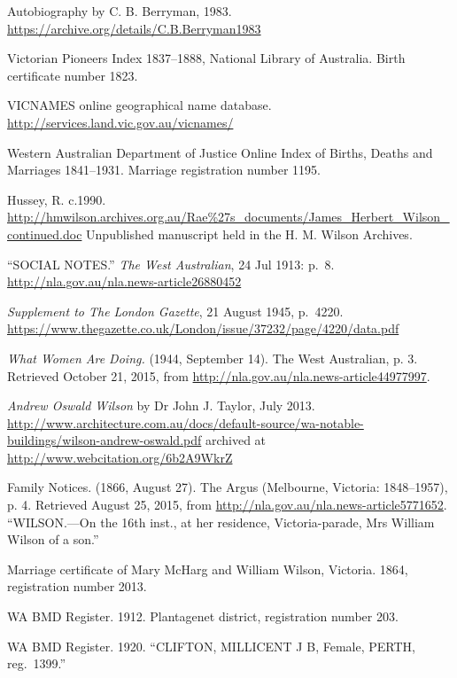 \begin{thebibliography}{999}
\footnotesize

	Autobiography by C. B. Berryman, 1983.
	\url{https://archive.org/details/C.B.Berryman1983}

	Victorian Pioneers Index 1837--1888, National Library of Australia.
	Birth certificate number 1823.

	VICNAMES online geographical name database.
	\url{http://services.land.vic.gov.au/vicnames/}

	Western Australian Department of Justice Online Index of Births, Deaths and Marriages 1841–1931.
	Marriage registration number 1195.

	Hussey, R. c.1990. \url{http://hmwilson.archives.org.au/Rae\%27s_documents/James_Herbert_Wilson_continued.doc}
	Unpublished manuscript held in the H. M. Wilson Archives.

	``SOCIAL NOTES.'' \emph{The West Australian}, 24 Jul 1913: p.\ 8.
	\url{http://nla.gov.au/nla.news-article26880452}

	\emph{Supplement to The London Gazette}, 21 August 1945, p.\ 4220.
	\url{https://www.thegazette.co.uk/London/issue/37232/page/4220/data.pdf}

	\emph{What Women Are Doing.} (1944, September 14). The West Australian, p. 3.
	Retrieved October 21, 2015, from \url{http://nla.gov.au/nla.news-article44977997}.

	\emph{Andrew Oswald Wilson} by Dr John J. Taylor, July 2013.
	\url{http://www.architecture.com.au/docs/default-source/wa-notable-buildings/wilson-andrew-oswald.pdf}
	archived at \url{http://www.webcitation.org/6b2A9WkrZ}

	Family Notices. (1866, August 27). The Argus (Melbourne, Victoria: 1848--1957), p. 4.
	Retrieved August 25, 2015, from \url{http://nla.gov.au/nla.news-article5771652}.
	``WILSON.---On the 16th inst., at her residence, Victoria-parade, Mrs William Wilson of a son.''

	Marriage certificate of Mary McHarg and William Wilson, Victoria. 1864, registration number 2013.

	WA BMD Register. 1912. Plantagenet district, registration number 203.

	WA BMD Register. 1920.
	``CLIFTON, MILLICENT J B, Female, PERTH, reg.\ 1399.''


\end{thebibliography}
